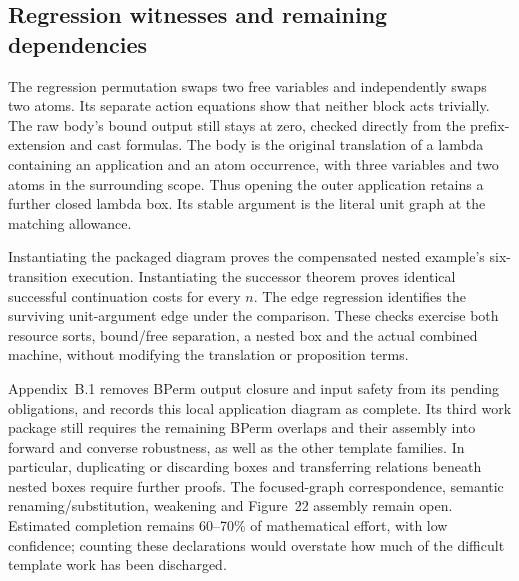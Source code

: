 
\subsection{Regression witnesses and remaining dependencies}
The regression permutation swaps two free variables and independently swaps
two atoms. Its separate action equations show that neither block acts
trivially. The raw body's bound output still stays at zero, checked directly
from the prefix-extension and cast formulas. The body is the original
translation of a lambda containing an application and an atom occurrence,
with three variables and two atoms in the surrounding scope. Thus opening
the outer application retains a further closed lambda box. Its stable
argument is the literal unit graph at the matching allowance.


Instantiating the packaged diagram proves the compensated nested example's
six-transition execution. Instantiating the successor theorem proves identical
successful continuation costs for every $n$. The edge regression identifies
the surviving unit-argument edge under the comparison. These checks exercise
both resource sorts, bound/free separation, a nested box and the actual
combined machine, without modifying the translation or proposition terms.


Appendix~B.1 removes BPerm output closure and input safety from its pending
obligations, and records this local application diagram as complete. Its
third work package still requires the remaining BPerm overlaps and their
assembly into forward and converse robustness, as well as the other template
families. In particular, duplicating or discarding boxes and transferring
relations beneath nested boxes require further proofs. The focused-graph
correspondence, semantic renaming/substitution, weakening and Figure~22
assembly remain open. Estimated completion remains 60--70\% of mathematical
effort, with low confidence; counting these declarations would overstate how
much of the difficult template work has been discharged.
